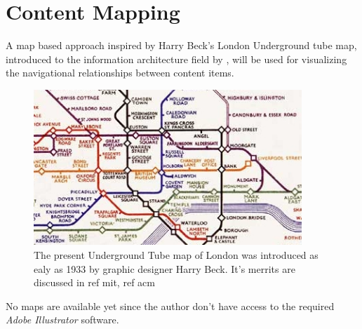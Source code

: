 \chapter{Content Mapping}

\label{appendix:content.mapping}

A map based approach inspired by Harry Beck's London Underground tube
map, introduced to the information
architecture field by \citet{walsh07}, will be used for visualizing the
navigational relationships between content items.
\begin{figure}[h]
  \begin{center}
    \includegraphics[width=0.9\textwidth]{beck_1933_map}
    \caption[1933 London Underground Tube map]{%
      The present Underground Tube map of London was introduced as ealy as
      1933 by graphic designer Harry Beck. It's merrits are discussed
      in ref mit, ref acm}
  \end{center}
\end{figure}

No maps are available yet since the author don't have access to the required
\emph{Adobe Illustrator} software.
